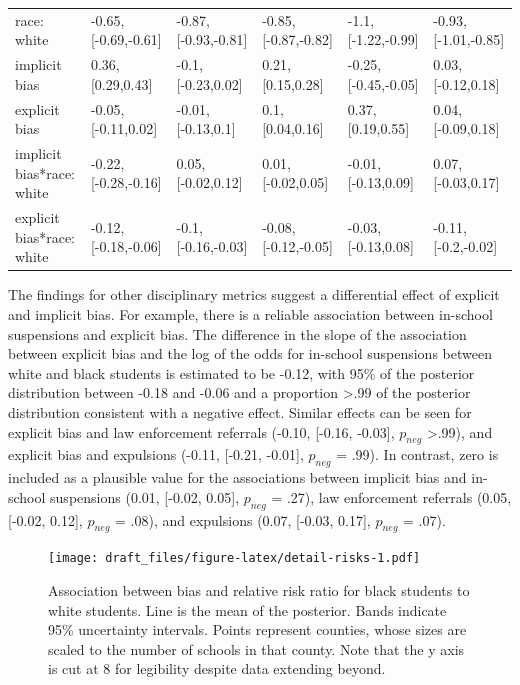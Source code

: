 \documentclass[english,floatsintext,man]{apa6}
\theoremstyle{definition}
\theoremstyle{definition}
\theoremstyle{remark}
\begin{document}
\begin{table}[tbp]
\begin{center}
\begin{threeparttable}
{\begin{tabular}{llllll}
race: white & -0.65, [-0.69,-0.61] & -0.87, [-0.93,-0.81] & -0.85, [-0.87,-0.82] & -1.1, [-1.22,-0.99] & -0.93, [-1.01,-0.85]\\
implicit bias & 0.36, [0.29,0.43] & -0.1, [-0.23,0.02] & 0.21, [0.15,0.28] & -0.25, [-0.45,-0.05] & 0.03, [-0.12,0.18]\\
explicit bias & -0.05, [-0.11,0.02] & -0.01, [-0.13,0.1] & 0.1, [0.04,0.16] & 0.37, [0.19,0.55] & 0.04, [-0.09,0.18]\\
implicit bias*race: white & -0.22, [-0.28,-0.16] & 0.05, [-0.02,0.12] & 0.01, [-0.02,0.05] & -0.01, [-0.13,0.09] & 0.07, [-0.03,0.17]\\
explicit bias*race: white & -0.12, [-0.18,-0.06] & -0.1, [-0.16,-0.03] & -0.08, [-0.12,-0.05] & -0.03, [-0.13,0.08] & -0.11, [-0.2,-0.02]\\
\bottomrule
\end{tabular}
}
\end{threeparttable}
\end{center}
\end{table}

The findings for other disciplinary metrics suggest a differential
effect of explicit and implicit bias. For example, there is a reliable
association between in-school suspensions and explicit bias. The
difference in the slope of the association between explicit bias and the
log of the odds for in-school suspensions between white and black
students is estimated to be -0.12, with 95\% of the posterior
distribution between -0.18 and -0.06 and a proportion \textgreater{}.99
of the posterior distribution consistent with a negative effect. Similar
effects can be seen for explicit bias and law enforcement referrals
(-0.10, {[}-0.16, -0.03{]}, \(p_{neg}\) \textgreater{}.99), and explicit
bias and expulsions (-0.11, {[}-0.21, -0.01{]}, \(p_{neg}\) = .99). In
contrast, zero is included as a plausible value for the associations
between implicit bias and in-school suspensions (0.01, {[}-0.02,
0.05{]}, \(p_{neg}\) = .27), law enforcement referrals (0.05, {[}-0.02,
0.12{]}, \(p_{neg}\) = .08), and expulsions (0.07, {[}-0.03, 0.17{]},
\(p_{neg}\) = .07).

\begin{figure}
\centering
\texttt{[image: draft\_files/figure-latex/detail-risks-1.pdf]}
\caption{\label{fig:detail-risks}Association between bias and relative risk
ratio for black students to white students. Line is the mean of the
posterior. Bands indicate 95\% uncertainty intervals. Points represent
counties, whose sizes are scaled to the number of schools in that
county. Note that the y axis is cut at 8 for legibility despite data
extending beyond.}
\end{figure}
\end{document}
